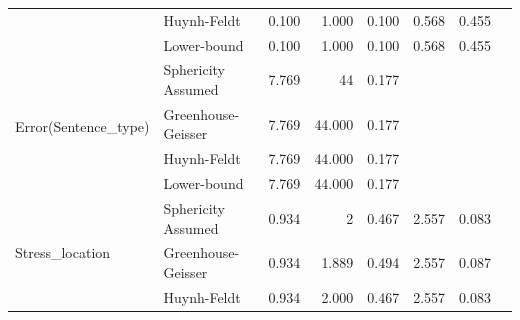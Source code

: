 \documentclass[a4paper]{article}
\begin{document}
\begin{table}[H]
\begin{tabular}{p{}p{}|l|r|r|r|r|r|}
\cline{2-7}
                                                        & Huynh-Feldt        & 0.100                                        & 1.000                   & 0.100                            & 0.568                  & 0.455                      \\ 
\cline{2-7}
                                                        & Lower-bound        & 0.100                                        & 1.000                   & 0.100                            & 0.568                  & 0.455                      \\ 
\hline
\multirow{4}{*}{Error(Sentence\_type)}                  & Sphericity Assumed & 7.769                                        & 44                      & 0.177                            & \multicolumn{1}{l|}{~} & \multicolumn{1}{l|}{~}     \\ 
\cline{2-7}
                                                        & Greenhouse-Geisser & 7.769                                        & 44.000                  & 0.177                            & \multicolumn{1}{l|}{~} & \multicolumn{1}{l|}{~}     \\ 
\cline{2-7}
                                                        & Huynh-Feldt        & 7.769                                        & 44.000                  & 0.177                            & \multicolumn{1}{l|}{~} & \multicolumn{1}{l|}{~}     \\ 
\cline{2-7}
                                                        & Lower-bound        & 7.769                                        & 44.000                  & 0.177                            & \multicolumn{1}{l|}{~} & \multicolumn{1}{l|}{~}     \\ 
\hline
\multirow{4}{*}{Stress\_location}                       & Sphericity Assumed & 0.934                                        & 2                       & 0.467                            & 2.557                  & 0.083                      \\ 
\cline{2-7}
                                                        & Greenhouse-Geisser & 0.934                                        & 1.889                   & 0.494                            & 2.557                  & 0.087                      \\ 
\cline{2-7}
                                                        & Huynh-Feldt        & 0.934                                        & 2.000                   & 0.467                            & 2.557                  & 0.083                      \\ 

\end{tabular}
\end{table}
\end{document}
